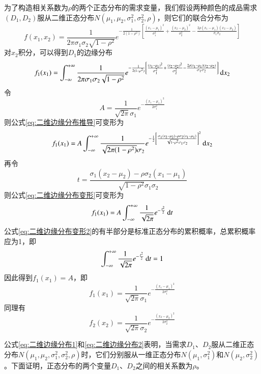 为了构造相关系数为$\rho$的两个正态分布的需求变量，我们假设两种颜色的成品需求$(D_1,D_2)$服从二维正态分布$N(\mu_1,\mu_2,\sigma_1^2,\sigma_2^2,\rho)$，则它们的联合分布为
\begin{equation}
f(x_1,x_2) = \frac{1}{2\pi\sigma_1\sigma_2\sqrt{1-\rho^2}}e^{-\frac{1}{2(1-\rho^2)}\left[\frac{(x_1-\mu_1)^2}{\sigma_1^2}+\frac{(x_2-\mu_2)^2}{\sigma_2^2}-\frac{2\rho(x_1-\mu_1)(x_2-\mu_2)}{\sigma_1\sigma_2}\right]}
\label{eq:二维正态分布概率密度}
\end{equation}
对$x_2$积分，可以得到$D_1$的边缘分布
\begin{equation}
f_1(x_1) = \int_{-\infty}^{+\infty}\frac{1}{2\pi\sigma_1\sigma_2\sqrt{1-\rho^2}}e^{-\frac{1}{2(1-\rho^2)}\left[\frac{(x_1-\mu_1)^2}{\sigma_1^2}+\frac{(x_2-\mu_2)^2}{\sigma_2^2}-\frac{2\rho(x_1-\mu_1)(x_2-\mu_2)}{\sigma_1\sigma_2}\right]}\operatorname{d\!} x_2
\label{eq:二维边缘分布推导}
\end{equation}
令
\[
A = \frac{1}{\sqrt{2\pi}\sigma_1}e^{-\frac{(x_1-\mu_1)^2}{2\sigma_1^2}}
\]
则公式\ref{eq:二维边缘分布推导}可变形为
\begin{equation}
f_1(x_1) = A\int_{-\infty}^{+\infty}\frac{1}{\sqrt{2\pi(1-\rho^2)}\sigma_2}e^{-\frac{1}{2}\left[\frac{\sigma_1(x_2-\mu_2)-\rho\sigma_2(x_1-\mu_1)}{\sqrt{1-\rho^2}\sigma_1\sigma_2}\right]^2}\operatorname{d\!} x_2
\label{eq:二维边缘分布变形}
\end{equation}
再令
\[
t = \frac{\sigma_1(x_2-\mu_2)-\rho\sigma_2(x_1-\mu_1)}{\sqrt{1-\rho^2}\sigma_1\sigma_2}
\]
则公式\ref{eq:二维边缘分布变形}可变形为
\begin{equation}
f_1(x_1) = A\int_{-\infty}^{+\infty}\frac{1}{\sqrt{2\pi}}e^{-\frac{t^2}{2}}\operatorname{d\!} t
\label{eq:二维边缘分布变形2}
\end{equation}
公式\ref{eq:二维边缘分布变形2}的有半部分是标准正态分布的累积概率，总累积概率应为1，即
\[
\int_{-\infty}^{+\infty}\frac{1}{\sqrt{2\pi}}e^{-\frac{t^2}{2}}\operatorname{d\!} t = 1
\]
因此得到$f_1(x_1)=A$，即
\begin{equation}
f_1(x_1) = \frac{1}{\sqrt{2\pi}\sigma_1}e^{-\frac{(x_1-\mu_1)^2}{2\sigma_1^2}}
\label{eq:二维边缘分布1}
\end{equation}
同理有
\begin{equation}
f_2(x_2) = \frac{1}{\sqrt{2\pi}\sigma_2}e^{-\frac{(x_2-\mu_2)^2}{2\sigma_2^2}}
\label{eq:二维边缘分布2}
\end{equation}

公式\ref{eq:二维边缘分布1}和\ref{eq:二维边缘分布2}表明，当需求$D_1$、$D_2$服从二维正态分布$N(\mu_1,\mu_2,\sigma_1^2,\sigma_2^2,\rho)$时，它们分别服从一维正态分布$N(\mu_1,\sigma_1^2)$和$N(\mu_2,\sigma_2^2)$。下面证明，正态分布的两个变量$D_1$、$D_2$之间的相关系数为$\rho$。

